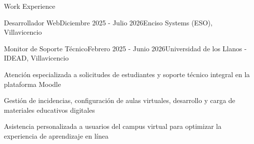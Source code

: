 \documentclass{resume} %
\begin{document}
\begin{rSection}{Work Experience}
\begin{rSubsection}{Desarrollador Web}{Diciembre 2025 - Julio 2026}{Enciso Systems (ESO), Villavicencio}{}
\end{rSubsection}

\begin{rSubsection}{Monitor de Soporte T\'ecnico}{Febrero 2025 - Junio 2026}{Universidad de los Llanos - IDEAD, Villavicencio}{}

\item Atenci\'on especializada a solicitudes de estudiantes y soporte t\'ecnico integral en la plataforma Moodle
\item Gesti\'on de incidencias, configuraci\'on de aulas virtuales, desarrollo y carga de materiales educativos digitales
\item Asistencia personalizada a usuarios del campus virtual para optimizar la experiencia de aprendizaje en l\'inea

\end{rSubsection}

\end{rSection}

\end{document}
